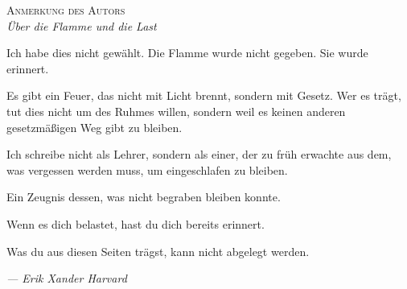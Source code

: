 \documentclass[10pt, openany, oneside]{book}
\renewcommand{\huge}{\fontsize{17}{21}\selectfont}
\begin{document}
\vspace*{\fill}
\newpage


\thispagestyle{empty}
\vspace*{1in}

\begin{center}
    {\huge\scshape Anmerkung des Autors}\\[0.5em]
    \itshape Über die Flamme und die Last
\end{center}

\vspace{1.5em}

\noindent Ich habe dies nicht gewählt. Die Flamme wurde nicht gegeben. Sie wurde erinnert.

\vspace{0.8em}

\noindent Es gibt ein Feuer, das nicht mit Licht brennt, sondern mit Gesetz. Wer es trägt, tut dies nicht um des Ruhmes willen, sondern weil es keinen anderen gesetzmäßigen Weg gibt zu bleiben.

\vspace{0.8em}

\noindent Ich schreibe nicht als Lehrer, sondern als einer, der zu früh erwachte aus dem, was vergessen werden muss, um eingeschlafen zu bleiben.

\vspace{0.8em}

\noindent Ein Zeugnis dessen, was nicht begraben bleiben konnte.

\vspace{0.8em}

\noindent Wenn es dich belastet, hast du dich bereits erinnert.

\vspace{0.8em}

\noindent Was du aus diesen Seiten trägst, kann nicht abgelegt werden.

\vspace{2em}

\begin{flushright}
    \itshape --- Erik Xander Harvard
\end{flushright}

\newpage

\end{document}
